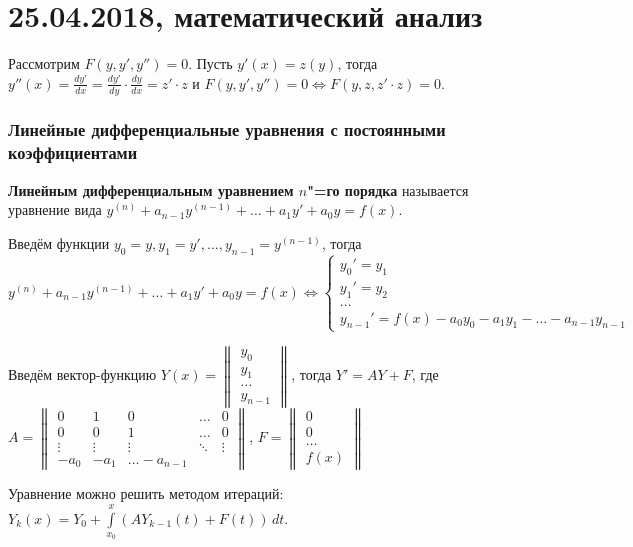 \chapter{25.04.2018, математический анализ}
Рассмотрим $F(y, y', y'') = 0$.
Пусть $y'(x) = z(y)$, тогда $y''(x) = \frac{dy'}{dx} = \frac{dy'}{dy} \cdot \frac{dy}{dx} = z' \cdot z$ и $F(y, y', y'') = 0 \Leftrightarrow F(y, z, z' \cdot z) = 0$.

\subsection{Линейные дифференциальные уравнения с постоянными коэффициентами}
\textbf{Линейным дифференциальным уравнением $n$"=го порядка} называется уравнение вида $y^{(n)} + a_{n-1} y^{(n-1)} + \ldots + a_1 y' + a_0 y = f(x)$.

Введём функции $y_0 = y, y_1 = y', \ldots, y_{n-1} = y^{(n-1)}$, тогда
\begin{equation*}
y^{(n)} + a_{n-1} y^{(n-1)} + \ldots + a_1 y' + a_0 y = f(x) \Leftrightarrow
\begin{cases}
y_0' = y_1 \\
y_1' = y_2 \\
\ldots \\
y_{n-1}' = f(x) - a_0 y_0 - a_1 y_1 - \ldots - a_{n-1} y_{n-1}
\end{cases}
\end{equation*}

Введём вектор-функцию $Y(x) =
\begin{Vmatrix}
y_0 \\
y_1 \\
\ldots \\
y_{n-1}
\end{Vmatrix}$, тогда $Y' = A Y + F$, где $A =
\begin{Vmatrix}
0 & 1 & 0 & \ldots & 0 \\
0 & 0 & 1 & \ldots & 0 \\
\vdots & \vdots & \vdots & \ddots & \vdots \\
-a_0 & -a_1 & \ldots -a_{n-1}
\end{Vmatrix}$, $F =
\begin{Vmatrix}
0 \\
0 \\
\ldots \\
f(x)
\end{Vmatrix}$

Уравнение можно решить методом итераций: $Y_k(x) = Y_0 + \int\limits_{x_0}^x (A Y_{k-1}(t) + F(t))\,dt$.

